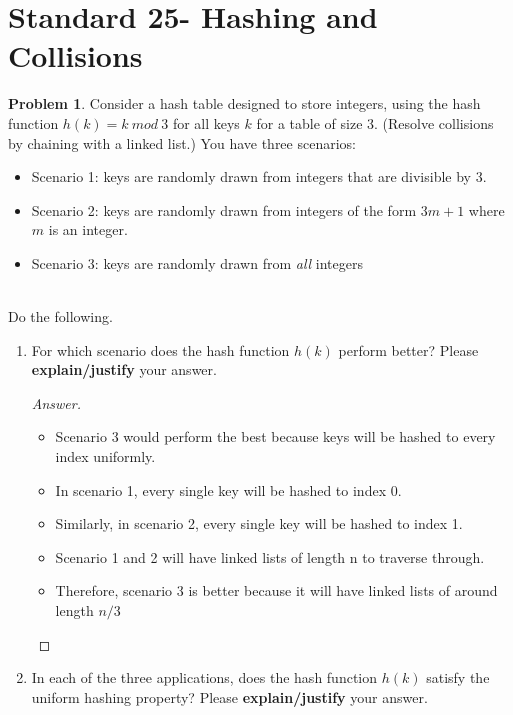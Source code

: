 \documentclass[11pt]{article}
\theoremstyle{definition}
\theoremstyle{definition}
\newtheorem{required}{Problem}
\theoremstyle{definition}
\begin{document}
\section{Standard 25- Hashing and Collisions}
\begin{required}
Consider a hash table designed to store integers, using the hash function $h(k)=k~mod~3$ for all keys $k$ for a table of size 3. (Resolve collisions by chaining with a linked list.) You have three scenarios: 
\begin{itemize}
\item Scenario 1: keys are randomly drawn from integers that are divisible by 3.

\item Scenario 2: keys are randomly drawn from integers of the form $3m+1$ where $m$ is an integer.

\item Scenario 3: keys are randomly drawn from \emph{all} integers
\end{itemize}


\noindent \\ Do the following.
\begin{enumerate}[label=(\alph*)]
\item For which scenario does the hash function $h(k)$ perform better? Please  {\bf explain/justify} your answer.


\begin{proof}[Answer] $ $ \\
\begin{itemize}
    \item Scenario 3 would perform the best because keys will be hashed to every index uniformly. 
    \item In scenario 1, every single key will be hashed to index 0. 
    \item Similarly, in scenario 2, every single key will be hashed to index 1. 
    \item Scenario 1 and 2 will have linked lists of length n to traverse through. 
    \item Therefore, scenario 3 is better because it will have linked lists of around length $n/3$
\end{itemize}
\end{proof}

\newpage

\item In each of the three applications, does the hash function $h(k)$ satisfy the uniform hashing property? Please {\bf explain/justify} your answer.


\end{enumerate}
\end{required}
\end{document}
